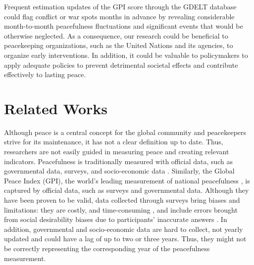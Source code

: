 \documentclass{bmcart}
\begin{document}
Frequent estimation updates of the GPI score through the GDELT database could flag conflict or war spots months in advance by revealing considerable month-to-month peacefulness fluctuations and significant events that would be otherwise neglected. 
As a consequence, our research could be beneficial to peacekeeping organizations, such as the United Nations and its agencies, to organize early interventions. In addition, it could be valuable to policymakers to apply adequate policies to prevent detrimental societal effects and contribute effectively to lasting peace.


\section{Related Works}
\label{literature_review}

Although peace is a central concept for the global community and peacekeepers strive for its maintenance, it has not a clear definition up to date. Thus, researchers are not easily guided in measuring peace and creating relevant indicators. 
Peacefulness is traditionally measured with official data, such as governmental data, surveys, and socio-economic data \cite{bruckner2010international,gries2020new, peace2011structures}. Similarly,  the Global Peace Index (GPI), the world's leading measurement of national peacefulness \cite{gpi_report_2020}, is captured by official data, such as surveys and governmental data. 
Although they have been proven to be valid, data collected through surveys bring biases and limitations: they are costly, and time-consuming \cite{solomon2001conducting, voukelatou2020measuring}, and 
include errors brought from social desirability biases due to participants' inaccurate answers \cite{brenner2016lies, voukelatou2020estimating}. 
In addition, governmental and socio-economic data are hard to collect, not yearly updated and could have a lag of up to two or three years. Thus, they might not be correctly representing the corresponding year of the peacefulness measurement. 
\end{document}
